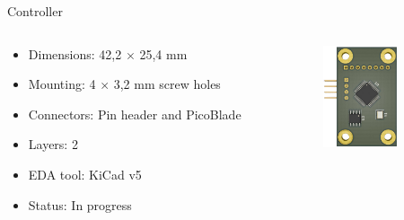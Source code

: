 
\begin{frame}{Controller}

    \begin{columns}[t]
        \begin{column}[t]{0.5\textwidth}
            \vspace{0.2cm}
            \begin{itemize}
                \item Dimensions: 42,2 $\times$ 25,4 mm
                \vspace{0.15cm}
                \item Mounting: 4 $\times$ 3,2 mm screw holes
                \vspace{0.15cm}
                \item Connectors: Pin header and PicoBlade
                \vspace{0.15cm}
                \item Layers: 2
                \vspace{0.15cm}
                \item EDA tool: KiCad v5
                \vspace{0.15cm}
                \item Status: In progress
            \end{itemize}
        \end{column}
        \begin{column}[t]{0.6\textwidth}
            \begin{columns}[t]
                \begin{column}[t]{0.3\textwidth}
                    \begin{figure}[!ht]
                        \begin{center}
                            \includegraphics[height=3cm]{figures/slcam-bottom}
                        \end{center}
                    \end{figure}        
                \end{column}

\end{columns}
\end{column}
\end{columns}
\end{frame}
